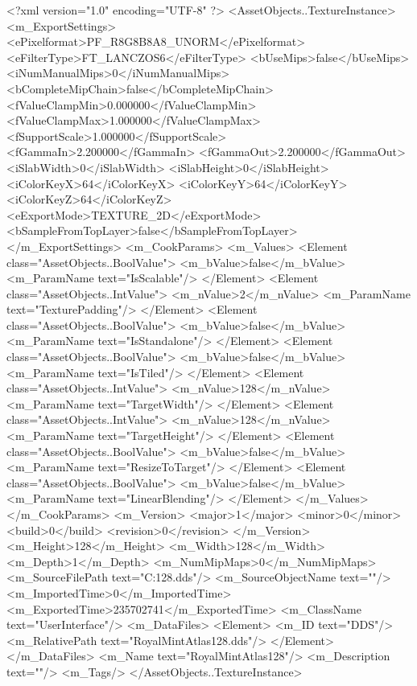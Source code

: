 <?xml version="1.0" encoding="UTF-8" ?>
<AssetObjects..TextureInstance>
	<m_ExportSettings>
		<ePixelformat>PF_R8G8B8A8_UNORM</ePixelformat>
		<eFilterType>FT_LANCZOS6</eFilterType>
		<bUseMips>false</bUseMips>
		<iNumManualMips>0</iNumManualMips>
		<bCompleteMipChain>false</bCompleteMipChain>
		<fValueClampMin>0.000000</fValueClampMin>
		<fValueClampMax>1.000000</fValueClampMax>
		<fSupportScale>1.000000</fSupportScale>
		<fGammaIn>2.200000</fGammaIn>
		<fGammaOut>2.200000</fGammaOut>
		<iSlabWidth>0</iSlabWidth>
		<iSlabHeight>0</iSlabHeight>
		<iColorKeyX>64</iColorKeyX>
		<iColorKeyY>64</iColorKeyY>
		<iColorKeyZ>64</iColorKeyZ>
		<eExportMode>TEXTURE_2D</eExportMode>
		<bSampleFromTopLayer>false</bSampleFromTopLayer>
	</m_ExportSettings>
	<m_CookParams>
		<m_Values>
			<Element class="AssetObjects..BoolValue">
				<m_bValue>false</m_bValue>
				<m_ParamName text="IsScalable"/>
			</Element>
			<Element class="AssetObjects..IntValue">
				<m_nValue>2</m_nValue>
				<m_ParamName text="TexturePadding"/>
			</Element>
			<Element class="AssetObjects..BoolValue">
				<m_bValue>false</m_bValue>
				<m_ParamName text="IsStandalone"/>
			</Element>
			<Element class="AssetObjects..BoolValue">
				<m_bValue>false</m_bValue>
				<m_ParamName text="IsTiled"/>
			</Element>
			<Element class="AssetObjects..IntValue">
				<m_nValue>128</m_nValue>
				<m_ParamName text="TargetWidth"/>
			</Element>
			<Element class="AssetObjects..IntValue">
				<m_nValue>128</m_nValue>
				<m_ParamName text="TargetHeight"/>
			</Element>
			<Element class="AssetObjects..BoolValue">
				<m_bValue>false</m_bValue>
				<m_ParamName text="ResizeToTarget"/>
			</Element>
			<Element class="AssetObjects..BoolValue">
				<m_bValue>false</m_bValue>
				<m_ParamName text="LinearBlending"/>
			</Element>
		</m_Values>
	</m_CookParams>
	<m_Version>
		<major>1</major>
		<minor>0</minor>
		<build>0</build>
		<revision>0</revision>
	</m_Version>
	<m_Height>128</m_Height>
	<m_Width>128</m_Width>
	<m_Depth>1</m_Depth>
	<m_NumMipMaps>0</m_NumMipMaps>
	<m_SourceFilePath text="C:\Users\aaron\Documents\RoyalMintAtlas128.dds"/>
	<m_SourceObjectName text=""/>
	<m_ImportedTime>0</m_ImportedTime>
	<m_ExportedTime>235702741</m_ExportedTime>
	<m_ClassName text="UserInterface"/>
	<m_DataFiles>
		<Element>
			<m_ID text="DDS"/>
			<m_RelativePath text="RoyalMintAtlas128.dds"/>
		</Element>
	</m_DataFiles>
	<m_Name text="RoyalMintAtlas128"/>
	<m_Description text=""/>
	<m_Tags/>
</AssetObjects..TextureInstance>

